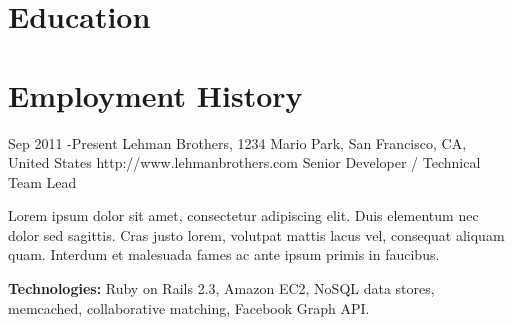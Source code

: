 
\section{Education}





\section{Employment History}

\job
{Sep 2011 -}{Present}
{Lehman Brothers, 1234 Mario Park, San Francisco, CA, United States}
{http://www.lehmanbrothers.com}
{Senior Developer / Technical Team Lead}
{Lorem ipsum dolor sit amet, consectetur adipiscing elit. Duis elementum nec dolor sed sagittis. Cras justo lorem, volutpat mattis lacus vel, consequat aliquam quam. Interdum et malesuada fames ac ante ipsum primis in faucibus.\\
\rule{0mm}{5mm}\textbf{Technologies:} Ruby on Rails 2.3, Amazon EC2, NoSQL data stores, memcached, collaborative matching, Facebook Graph API.}



